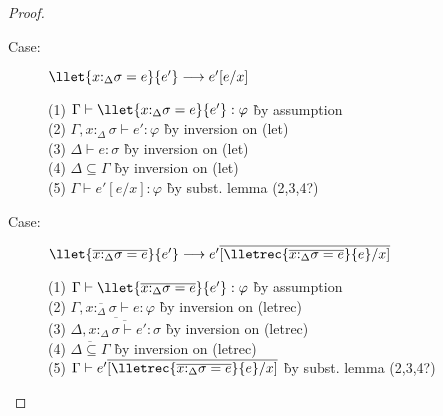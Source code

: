 \begin{proof}
\begin{description}
\item[Case:] $\llet{x{:}_\Delta\sigma = e}{e'}\longrightarrow e'[e/x]$
\begin{tabbing}
(1) $\Gamma \vdash \llet{x{:}_\Delta\sigma = e}{e'} : \varphi$ \` by assumption \\
(2) $\Gamma, x{:}_\Delta\sigma \vdash e' : \varphi$ \` by inversion on (let) \\
(3) $\Delta \vdash e : \sigma$ \` by inversion on (let) \\
(4) $\Delta \subseteq \Gamma$ \` by inversion on (let) \\
(5) $\Gamma \vdash e'[e/x] : \varphi$ \` by subst. lemma (2,3,4?) \\
\end{tabbing}

\item[Case:] $\llet{\overline{x{:}_\Delta\sigma = e}}{e'} \longrightarrow e'\overline{[\lletrec{\overline{x{:}_\Delta\sigma = e}}{e}/x]}$
\begin{tabbing}
(1) $\Gamma \vdash \llet{\overline{x{:}_\Delta\sigma = e}}{e'} : \varphi$ \` by assumption \\
(2) $\Gamma, \overline{x{:}_\Delta\sigma} \vdash e : \varphi$ \` by inversion on (letrec) \\
(3) $\overline{\Delta, \overline{x{:}_\Delta\sigma \vdash e' : \sigma}}$ \` by inversion on (letrec) \\
(4) $\overline{\Delta\subseteq\Gamma}$ \` by inversion on (letrec) \\
(5) $\Gamma \vdash e'\overline{[\lletrec{\overline{x{:}_\Delta\sigma = e}}{e}/x]}$ \` by subst. lemma (2,3,4?) \\
\end{tabbing}


\end{description}
\end{proof}
